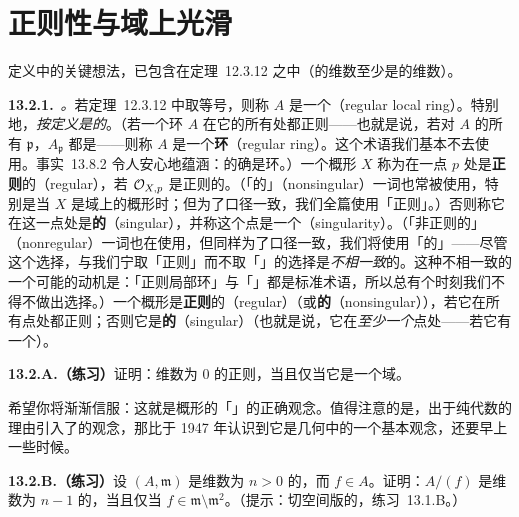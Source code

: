 
\section{正则性与域上光滑}

\trRegularity{}定义中的关键想法，已包含在定理~12.3.12 之中（\trZariski{}\trTangentSpace{}的维数至少是\trLocalRing{}的维数）。

\textbf{13.2.1.}\ \emph{\trhDefinition{}。}\quad 若定理~12.3.12 中取等号，则称 $A$ 是一个\textbf{\trRegular\trLocalRing}（regular local ring）。特别地，\emph{\trRegular\trLocalRing{}按定义是\trNoetherian{}的}。（若一个\trNoetherian{}环 $A$ 在它的所有\trPrimeIdeal{}处都正则——也就是说，若对 $A$ 的所有\trPrimeIdeal{} $\mathfrak{p}$，$A_{\mathfrak{p}}$ 都是\trRegular\trLocalRing——则称 $A$ 是一个\textbf{\trRegular{}环}（regular ring）。这个术语我们基本不去使用。事实~13.8.2 令人安心地蕴涵：\trRegular\trLocalRing{}的确是\trRegular{}环。）一个\trLocally\trNoetherian{}概形 $X$ 称为在一点 $p$ 处是\textbf{正则}的（regular），若\trLocalRing{} $\mathcal{O}_{X,p}$ 是正则的。（「\trNonsingular{}的」（nonsingular）一词也常被使用，特别是当 $X$ 是域上的\trFiniteType{}概形时；但为了口径一致，我们全篇使用「正则」。）否则称它在这一点处是\textbf{\trSingular{}的}（singular），并称这个点是一个\textbf{\trSingularPoint}（singularity）。（「非正则的」（nonregular）一词也在使用，但同样为了口径一致，我们将使用「\trSingular{}的」——尽管这个选择，与我们宁取「正则」而不取「\trNonsingular」的选择是\emph{不相一致}的。这种不相一致的一个可能的动机是：「正则局部环」与「\trSingularPoint」都是标准术语，所以总有个时刻我们不得不做出选择。）一个概形是\textbf{正则}的（regular）（或\textbf{\trNonsingular{}的}（nonsingular）），若它在所有点处都正则；否则它是\textbf{\trSingular{}的}（singular）（也就是说，它在\emph{至少一个}点处\trSingular——若它有一个\trSingularPoint）。

\textbf{13.2.A.（练习）}\quad 证明：维数为 $0$ 的\trNoetherian\trLocalRing{}正则，当且仅当它是一个域。

希望你将渐渐信服：这就是概形的「\trSmoothness」的正确观念。值得注意的是，\trKrull{}出于纯代数的理由引入了\trRegular\trLocalRing{}的观念，那比\trZariski{}于 1947 年认识到它是几何中的一个基本观念，还要早上一些时候。

\textbf{13.2.B.（练习）}\quad 设 $(A,\mathfrak{m})$ 是维数为 $n>0$ 的\trRegular\trLocalRing，而 $f\in A$。证明：$A/(f)$ 是维数为 $n-1$ 的\trRegular\trLocalRing，当且仅当 $f\in\mathfrak{m}\setminus\mathfrak{m}^2$。（提示：切空间版的\trKrull{}\trPrincipalIdealTheorem，\mbox{练习~13.1.B}。）

